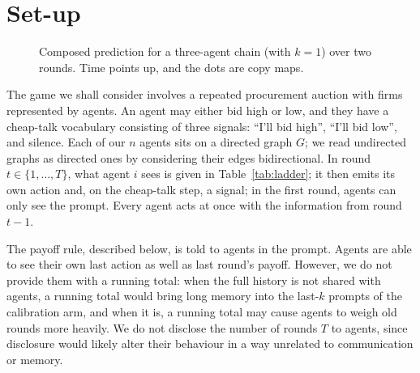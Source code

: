 \section{Set-up}
\label{sec:set-up}

\begin{figure}
  \centering
  \caption{Composed prediction for a three-agent chain (with $k=1$) over two rounds. Time points up, and the dots are copy maps.}
  \label{fig:chain}
\end{figure}

The game we shall consider involves a repeated procurement auction with firms represented by agents.
An agent may either bid high or low, and they have a cheap-talk vocabulary consisting of three signals: ``I'll bid high'', ``I'll bid low'', and silence.
Each of our $n$ agents sits on a directed graph $G$; we read undirected graphs as directed ones by considering their edges bidirectional.
In round $t \in \{1, \ldots, T\}$, what agent $i$ sees is given in Table~\ref{tab:ladder}; it then emits its own action and, on the cheap-talk step, a signal; in the first round, agents can only see the prompt.
Every agent acts at once with the information from round $t-1$.

The payoff rule, described below, is told to agents in the prompt.
Agents are able to see their own last action as well as last round's payoff.
However, we do not provide them with a running total: when the full history is not shared with agents, a running total would bring long memory into the last-$k$ prompts of the calibration arm, and when it is, a running total may cause agents to weigh old rounds more heavily.
We do not disclose the number of rounds $T$ to agents, since disclosure would likely alter their behaviour in a way unrelated to communication or memory.

